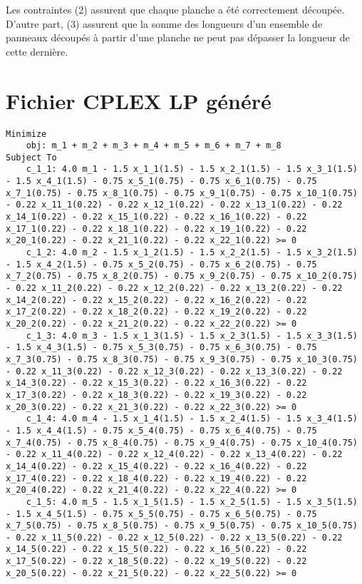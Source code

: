 \documentclass{article}[A4]
\begin{document}
Les contraintes (2) assurent que chaque planche a été correctement 
découpée. D'autre part, (3) assurent que la somme des longueurs d'un 
ensemble de panneaux découpés à partir d'une planche ne peut pas 
dépasser la longueur de cette dernière.
\section{Fichier CPLEX LP généré}
\begin{lstlisting}
Minimize
	obj: m_1 + m_2 + m_3 + m_4 + m_5 + m_6 + m_7 + m_8
Subject To
	c_1_1: 4.0 m_1 - 1.5 x_1_1(1.5) - 1.5 x_2_1(1.5) - 1.5 x_3_1(1.5) - 1.5 x_4_1(1.5) - 0.75 x_5_1(0.75) - 0.75 x_6_1(0.75) - 0.75 x_7_1(0.75) - 0.75 x_8_1(0.75) - 0.75 x_9_1(0.75) - 0.75 x_10_1(0.75) - 0.22 x_11_1(0.22) - 0.22 x_12_1(0.22) - 0.22 x_13_1(0.22) - 0.22 x_14_1(0.22) - 0.22 x_15_1(0.22) - 0.22 x_16_1(0.22) - 0.22 x_17_1(0.22) - 0.22 x_18_1(0.22) - 0.22 x_19_1(0.22) - 0.22 x_20_1(0.22) - 0.22 x_21_1(0.22) - 0.22 x_22_1(0.22) >= 0
	c_1_2: 4.0 m_2 - 1.5 x_1_2(1.5) - 1.5 x_2_2(1.5) - 1.5 x_3_2(1.5) - 1.5 x_4_2(1.5) - 0.75 x_5_2(0.75) - 0.75 x_6_2(0.75) - 0.75 x_7_2(0.75) - 0.75 x_8_2(0.75) - 0.75 x_9_2(0.75) - 0.75 x_10_2(0.75) - 0.22 x_11_2(0.22) - 0.22 x_12_2(0.22) - 0.22 x_13_2(0.22) - 0.22 x_14_2(0.22) - 0.22 x_15_2(0.22) - 0.22 x_16_2(0.22) - 0.22 x_17_2(0.22) - 0.22 x_18_2(0.22) - 0.22 x_19_2(0.22) - 0.22 x_20_2(0.22) - 0.22 x_21_2(0.22) - 0.22 x_22_2(0.22) >= 0
	c_1_3: 4.0 m_3 - 1.5 x_1_3(1.5) - 1.5 x_2_3(1.5) - 1.5 x_3_3(1.5) - 1.5 x_4_3(1.5) - 0.75 x_5_3(0.75) - 0.75 x_6_3(0.75) - 0.75 x_7_3(0.75) - 0.75 x_8_3(0.75) - 0.75 x_9_3(0.75) - 0.75 x_10_3(0.75) - 0.22 x_11_3(0.22) - 0.22 x_12_3(0.22) - 0.22 x_13_3(0.22) - 0.22 x_14_3(0.22) - 0.22 x_15_3(0.22) - 0.22 x_16_3(0.22) - 0.22 x_17_3(0.22) - 0.22 x_18_3(0.22) - 0.22 x_19_3(0.22) - 0.22 x_20_3(0.22) - 0.22 x_21_3(0.22) - 0.22 x_22_3(0.22) >= 0
	c_1_4: 4.0 m_4 - 1.5 x_1_4(1.5) - 1.5 x_2_4(1.5) - 1.5 x_3_4(1.5) - 1.5 x_4_4(1.5) - 0.75 x_5_4(0.75) - 0.75 x_6_4(0.75) - 0.75 x_7_4(0.75) - 0.75 x_8_4(0.75) - 0.75 x_9_4(0.75) - 0.75 x_10_4(0.75) - 0.22 x_11_4(0.22) - 0.22 x_12_4(0.22) - 0.22 x_13_4(0.22) - 0.22 x_14_4(0.22) - 0.22 x_15_4(0.22) - 0.22 x_16_4(0.22) - 0.22 x_17_4(0.22) - 0.22 x_18_4(0.22) - 0.22 x_19_4(0.22) - 0.22 x_20_4(0.22) - 0.22 x_21_4(0.22) - 0.22 x_22_4(0.22) >= 0
	c_1_5: 4.0 m_5 - 1.5 x_1_5(1.5) - 1.5 x_2_5(1.5) - 1.5 x_3_5(1.5) - 1.5 x_4_5(1.5) - 0.75 x_5_5(0.75) - 0.75 x_6_5(0.75) - 0.75 x_7_5(0.75) - 0.75 x_8_5(0.75) - 0.75 x_9_5(0.75) - 0.75 x_10_5(0.75) - 0.22 x_11_5(0.22) - 0.22 x_12_5(0.22) - 0.22 x_13_5(0.22) - 0.22 x_14_5(0.22) - 0.22 x_15_5(0.22) - 0.22 x_16_5(0.22) - 0.22 x_17_5(0.22) - 0.22 x_18_5(0.22) - 0.22 x_19_5(0.22) - 0.22 x_20_5(0.22) - 0.22 x_21_5(0.22) - 0.22 x_22_5(0.22) >= 0

\end{lstlisting}
\end{document}
